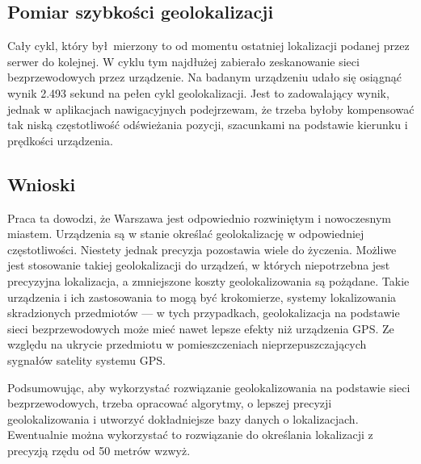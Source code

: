 \subsection{Pomiar szybkości geolokalizacji}
Cały cykl, który był mierzony to od momentu ostatniej lokalizacji podanej przez serwer do kolejnej. W cyklu tym najdłużej zabierało zeskanowanie sieci bezprzewodowych przez urządzenie.  Na badanym urządzeniu udało się osiągnąć wynik 2.493 sekund na pełen cykl geolokalizacji. Jest to zadowalający wynik, jednak w aplikacjach nawigacyjnych podejrzewam, że trzeba byłoby kompensować tak niską częstotliwość odświeżania pozycji, szacunkami na podstawie kierunku i prędkości urządzenia.

\subsection{Wnioski}
Praca ta dowodzi, że Warszawa jest odpowiednio rozwiniętym i nowoczesnym miastem. Urządzenia są w stanie określać geolokalizację w odpowiedniej częstotliwości. Niestety jednak precyzja pozostawia wiele do życzenia. Możliwe jest stosowanie takiej geolokalizacji do urządzeń, w których niepotrzebna jest precyzyjna lokalizacja, a zmniejszone koszty geolokalizowania są pożądane. Takie urządzenia i ich zastosowania to mogą być krokomierze, systemy lokalizowania skradzionych przedmiotów — w tych przypadkach, geolokalizacja na podstawie sieci bezprzewodowych może mieć nawet lepsze efekty niż urządzenia GPS. Ze względu na ukrycie przedmiotu w pomieszczeniach nieprzepuszczających sygnałów satelity systemu GPS.

Podsumowując, aby wykorzystać rozwiązanie geolokalizowania na podstawie sieci bezprzewodowych, trzeba opracować algorytmy, o lepszej precyzji geolokalizowania i utworzyć dokładniejsze bazy danych o lokalizacjach. Ewentualnie można wykorzystać to rozwiązanie do określania lokalizacji z precyzją rzędu od 50 metrów wzwyż.
